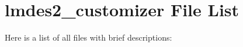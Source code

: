 \section{lmdes2\_\-customizer File List}
Here is a list of all files with brief descriptions:\begin{CompactList}
\item{}
\item{}
\end{CompactList}
